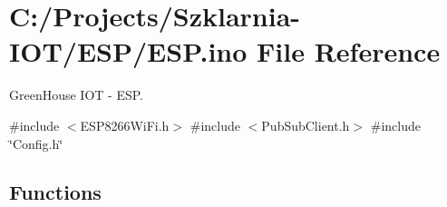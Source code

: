 \hypertarget{_e_s_p_8ino}{}\section{C\+:/\+Projects/\+Szklarnia-\/\+I\+O\+T/\+E\+S\+P/\+E\+SP.ino File Reference}
\label{_e_s_p_8ino}


Green\+House I\+OT -\/ E\+SP.  


{\ttfamily \#include $<$E\+S\+P8266\+Wi\+Fi.\+h$>$}\newline
{\ttfamily \#include $<$Pub\+Sub\+Client.\+h$>$}\newline
{\ttfamily \#include \char`\"{}Config.\+h\char`\"{}}\newline
\subsection*{Functions}
